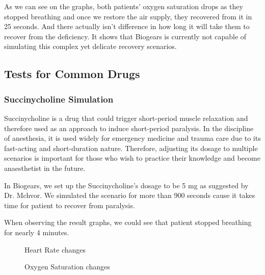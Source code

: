 \documentclass[a4paper]{article}
\begin{document}
As we can see on the graphs, both patients' oxygen saturation drops as they stopped breathing and once we restore the air supply, they recovered from it in 25 seconds. And there actually isn't difference in how long it will take them to recover from the deficiency. It shows that Biogears is currently not capable of simulating this complex yet delicate recovery scenarios.

\subsection{Tests for Common Drugs}

\subsubsection{Succinycholine Simulation}

Succinycholine is a drug that could trigger short-period muscle relaxation and therefore used as an approach to induce short-period paralysis. In the discipline of anesthesia, it is used widely for emergency medicine and trauma care due to its fast-acting and short-duration nature. Therefore, adjusting its dosage to multiple scenarios is important for those who wish to practice their knowledge and become anaesthetist in the future.

In Biogears, we set up the Succinycholine's dosage to be 5 mg as suggested by Dr. Mchvor. We simulated the scenario for  
more than 900 seconds cause it takes time for patient to recover from paralysis.

When observing the result graphs, we could see that patient stopped breathing for nearly 4 minutes. 

\begin{figure}[!htb]\centering
   \begin{minipage}{0.49\textwidth}
     \caption{Heart Rate changes}
     \label{fig:given 5 mg Succinylcholine}
     
   \end{minipage}
   \begin {minipage}{0.49\textwidth}
     \caption{Oxygen Saturation changes}
     \label{fig:given 5 mg Succinylcholine}
   \end{minipage}
\end{figure}
\end{document}
